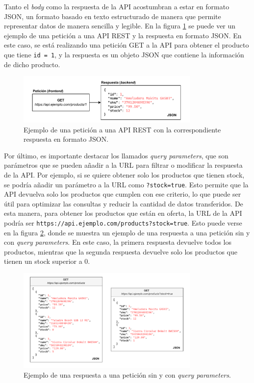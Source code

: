 Tanto el \textit{body} como la respuesta de la API acostumbran a estar en formato JSON, un formato basado en texto estructurado de manera que permite representar datos de manera sencilla y legible. En la figura \ref{fig:api_example} se puede ver un ejemplo de una petición a una API REST y la respuesta en formato JSON. En este caso, se está realizando una petición GET a la API para obtener el producto que tiene \texttt{id = 1}, y la respuesta es un objeto JSON que contiene la información de dicho producto.

\begin{figure}[H]
    \centering
    \includegraphics[width=0.8\textwidth]{figures/theoric_frame/api_example.pdf}
    \caption{Ejemplo de una petición a una API REST con la correspondiente respuesta en formato JSON.}
    \label{fig:api_example}
\end{figure}

Por último, es importante destacar los llamados \textit{query parameters}, que son parámetros que se pueden añadir a la URL para filtrar o modificar la respuesta de la API. Por ejemplo, si se quiere obtener solo los productos que tienen stock, se podría añadir un parámetro a la URL como \texttt{?stock=true}. Esto permite que la API devuelva solo los productos que cumplen con ese criterio, lo que puede ser útil para optimizar las consultas y reducir la cantidad de datos transferidos. De esta manera, para obtener los productos que están en oferta, la URL de la API podría ser \texttt{https://api.ejemplo.com/products?stock=true}. Esto puede verse en la figura \ref{fig:query_params_example}, donde se muestra un ejemplo de una respuesta a una petición sin y con \textit{query parameters}. En este caso, la primera respuesta devuelve todos los productos, mientras que la segunda respuesta devuelve solo los productos que tienen un stock superior a 0.

\begin{figure}[H]
    \centering
    \includegraphics[width=0.8\textwidth]{figures/theoric_frame/query_params_example.pdf}
    \caption{Ejemplo de una respuesta a una petición sin y con \textit{query parameters}.}
    \label{fig:query_params_example}
\end{figure}


